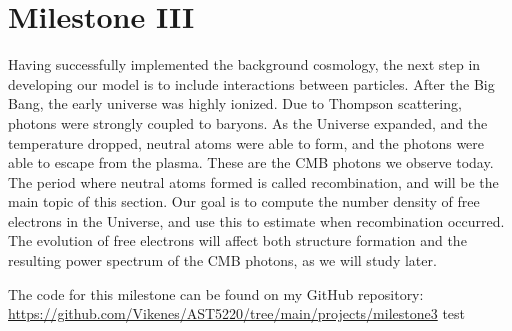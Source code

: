 \section{Milestone III}\label{M3}
Having successfully implemented the background cosmology, the next step in 
developing our model is to include interactions between particles. After the Big Bang, the early universe was highly ionized. Due to Thompson scattering, photons were strongly coupled to baryons. As the Universe expanded, and the temperature dropped, neutral atoms were able to form, and the photons were able to escape from the plasma. These are the CMB photons we observe today. The period where neutral atoms formed is called recombination, and will be the main topic of this section. Our goal is to compute the number density of free electrons in the Universe, and use this to estimate when recombination occurred. The evolution of free electrons will affect both structure formation and the resulting power spectrum of the CMB photons, as we will study later.

The code for this milestone can be found on my GitHub repository: \url{https://github.com/Vikenes/AST5220/tree/main/projects/milestone3} test





 